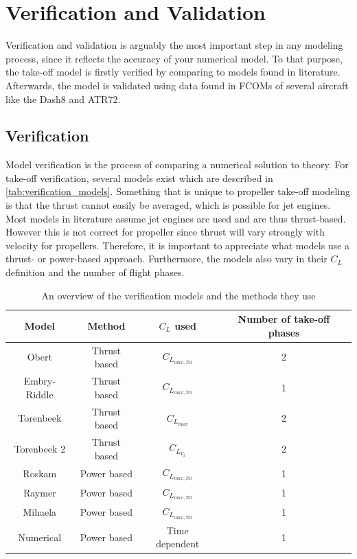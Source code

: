 \chapter{Verification and Validation}\label{chapter:VV}
Verification and validation is arguably the most important step in any modeling process, since it reflects the accuracy of your numerical model. To that purpose, the take-off model is firstly verified by comparing to models found in literature. Afterwards, the model is validated using data found in FCOMs of several aircraft like the Dash8 and ATR72.

\section{Verification}\label{sec:verification}
Model verification is the process of comparing a numerical solution to theory. For take-off verification, several models exist which are described in \autoref{tab:verification_models}. Something that is unique to propeller take-off modeling is that the thrust cannot easily be averaged, which is possible for jet engines. Most models in literature assume jet engines are used and are thus thrust-based. However this is not correct for propeller since thrust will vary strongly with velocity for propellers. Therefore, it is important to appreciate what models use a thrust- or power-based approach. Furthermore, the models also vary in their $C_L$ definition and the number of flight phases.

\begin{table}[!ht]
    \centering
    \begin{tabular}{cccc} \hline
       \textbf{Model}       & \textbf{Method}   & $C_L$ \textbf{used}   & \textbf{Number of take-off phases}    \\ \hline \hline
       Obert                & Thrust based      & $C_{L_{max,TO}}$      & 2                                     \\
       Embry-Riddle         & Thrust based      & $C_{L_{max,TO}}$      & 1                                     \\
       Torenbeek            & Thrust based      & $C_{L_{max}}$         & 2                                     \\
       Torenbeek 2          & Thrust based      & $C_{L_{V_2}}$         & 2                                     \\
       Roskam               & Power based       & $C_{L_{max,TO}}$      & 1                                     \\
       Raymer               & Power based       & $C_{L_{max,TO}}$      & 1                                     \\
       Mihaela              & Power based       & $C_{L_{max,TO}}$      & 1                                     \\
       Numerical            & Power based       & Time dependent        & 1                                     \\ \hline
    \end{tabular}
    \caption{An overview of the verification models and the methods they use}
    \label{tab:verification_models}
\end{table}

